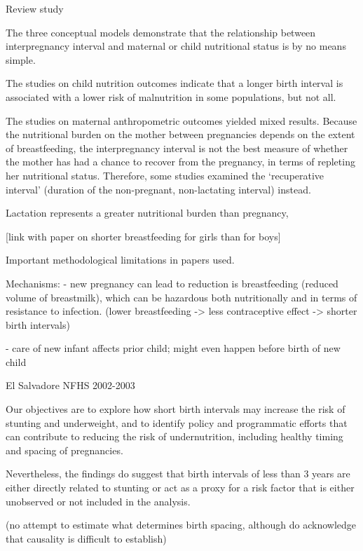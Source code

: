 
\citet{Dewey2007}

Review study

The three conceptual models demonstrate that the relationship between
interpregnancy interval and maternal or child nutritional status is by
no means simple.

The studies on child nutrition outcomes indicate that a longer birth
interval is associated with a lower risk of malnutrition in some
populations, but not all.

The studies on maternal anthropometric outcomes yielded mixed results.
Because the nutritional burden on the mother between pregnancies depends
on the extent of breastfeeding, the interpregnancy interval is not the
best measure of whether the mother has had a chance to recover from the
pregnancy, in terms of repleting her nutritional status. Therefore, some
studies examined the ‘recuperative interval’ (duration of the
non-pregnant, non-lactating interval) instead.

Lactation represents a greater nutritional burden than pregnancy,

[link with paper on shorter breastfeeding for girls than for boys]

Important methodological limitations in papers used.

Mechanisms: 
- new pregnancy can lead to reduction is breastfeeding (reduced volume
of breastmilk), which
can be hazardous both nutritionally and in terms of resistance to
infection.
(lower breastfeeding -> less contraceptive effect -> shorter birth
intervals)

- care of new infant affects prior child; might even happen before birth
of new child

\citet{Gribble2009}

El Salvadore NFHS 2002-2003

Our objectives are to explore how short birth intervals may increase the
risk of stunting and underweight, and to identify policy and
programmatic efforts that can contribute to reducing the risk of
undernutrition, including healthy timing and spacing of pregnancies.

Nevertheless, the ﬁndings do suggest that birth intervals of less than 3
years are either directly related to stunting or act as a proxy for a
risk factor that is either unobserved or not included in the analysis.

(no attempt to estimate what determines birth spacing, although do
acknowledge that
causality is difficult to establish)

